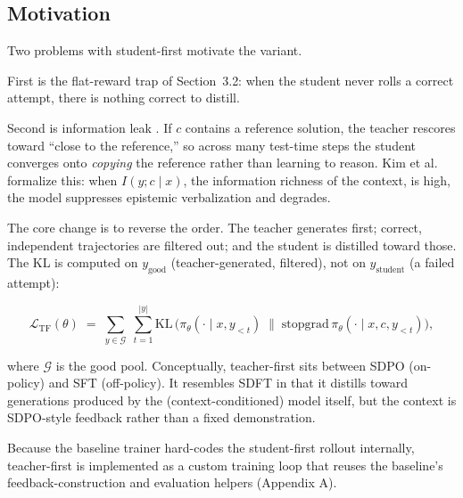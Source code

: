\documentclass[12pt,a4paper]{report}
\begin{document}
\subsection{Motivation}\label{motivation}

Two problems with student-first motivate the variant.

First is the flat-reward trap of Section~3.2: when the student never rolls a correct attempt, there is nothing correct to distill.

Second is information leak \cite{r2}. If \(c\) contains a reference solution, the teacher rescores toward ``close to the reference,'' so across many test-time steps the student converges onto \emph{copying} the reference rather than learning to reason. Kim et al.~\cite{r2} formalize this: when \(I(y; c \mid x)\), the information richness of the context, is high, the model suppresses epistemic verbalization and degrades.

The core change is to reverse the order. The teacher generates first; correct, independent trajectories are filtered out; and the student is distilled toward those. The KL is computed on \(y_{\text{good}}\) (teacher-generated, filtered), not on \(y_{\text{student}}\) (a failed attempt):

\[
\mathcal{L}_{\text{TF}}(\theta) \;=\; \sum_{y \in \mathcal{G}} \; \sum_{t=1}^{|y|} \mathrm{KL}\,\Big(\pi_\theta(\cdot \mid x, y_{<t}) \;\big\|\; \mathrm{stopgrad}\,\pi_\theta(\cdot \mid x, c, y_{<t})\Big),
\]

where \(\mathcal{G}\) is the good pool. Conceptually, teacher-first sits between SDPO (on-policy) and SFT (off-policy). It resembles SDFT \cite{r3} in that it distills toward generations produced by the (context-conditioned) model itself, but the context is SDPO-style feedback \cite{r1} rather than a fixed demonstration.

Because the baseline trainer hard-codes the student-first rollout internally, teacher-first is implemented as a custom training loop that reuses the baseline's feedback-construction and evaluation helpers (Appendix A).
\end{document}
